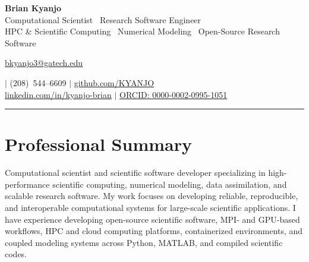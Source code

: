 \documentclass[11pt]{article}
\newcommand{\emaillink}[1]{%
\href{mailto:#1}{#1}%
}
\begin{document}

\begin{center}

{\Huge\bfseries Brian Kyanjo}\\[6pt]

{\large Computational Scientist \textbar\ Research Software Engineer}\\[2pt]
{\small HPC \& Scientific Computing \textbar\ Numerical Modeling \textbar\ Open-Source Research Software}\\[8pt]

\small

\emaillink{bkyanjo3@gatech.edu}
\quad $\vert$ \quad
(208)~544--6609
\quad $\vert$ \quad
\href{https://github.com/KYANJO}{github.com/KYANJO}
\\[2pt]

\href{https://linkedin.com/in/kyanjo-brian}
{linkedin.com/in/kyanjo-brian}
\quad $\vert$ \quad
\href{https://orcid.org/0000-0002-0995-1051}
{ORCID: 0000-0002-0995-1051}

\end{center}

\vspace{4pt}
\hrule
\vspace{10pt}



\section*{Professional Summary}

Computational scientist and scientific software developer specializing in high-performance scientific computing, numerical modeling, data assimilation, and scalable research software. My work focuses on developing reliable, reproducible, and interoperable computational systems for large-scale scientific applications. I have experience developing open-source scientific software, MPI- and GPU-based workflows, HPC and cloud computing platforms, containerized environments, and coupled modeling systems across Python, MATLAB, and compiled scientific codes.


\end{document}
